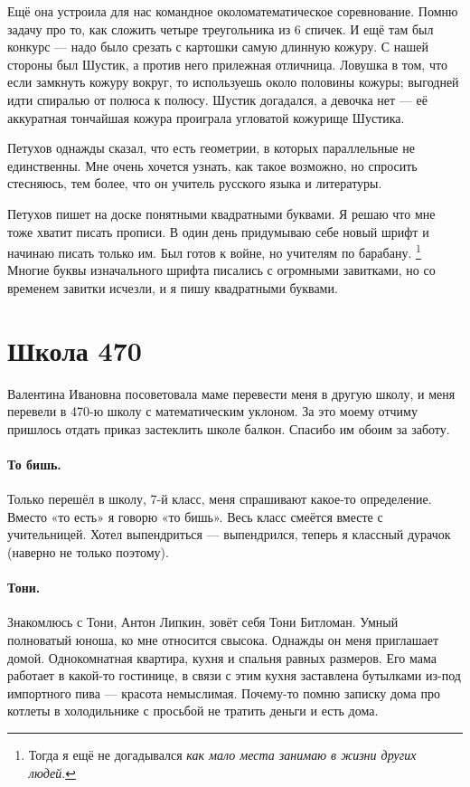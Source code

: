 \documentclass{book}
\begin{document}
Ещё она устроила для нас командное околоматематическое соревнование.
Помню задачу про то, как сложить четыре треугольника из 6 спичек.
И ещё там был конкурс --- надо было срезать с картошки самую длинную кожуру.
С нашей стороны был Шустик, а против него прилежная отличница.
Ловушка в том, что если замкнуть кожуру вокруг, то используешь около половины кожуры; выгодней идти спиралью от полюса к полюсу.
Шустик догадался, а девочка нет --- её аккуратная тончайшая кожура проиграла угловатой кожурище Шустика.

Петухов однажды сказал, что есть геометрии, в которых параллельные не единственны.
Мне очень хочется узнать, как такое возможно, но спросить стесняюсь, тем более, что он учитель русского языка и литературы.

Петухов пишет на доске понятными квадратными буквами.
Я решаю что мне тоже хватит писать прописи.
В один день придумываю себе новый шрифт и начинаю писать только им.
Был готов к войне, но учителям по барабану.%
\footnote{Тогда я ещё не догадывался \textit{как мало места занимаю в жизни других людей}.}
Многие буквы изначального шрифта писались с огромными завитками, но со временем завитки исчезли, и я пишу квадратными буквами.



\section*{Школа 470}

Валентина Ивановна посоветовала маме перевести меня в другую школу, и
меня перевели в 470-ю школу с математическим уклоном.
За это моему отчиму пришлось отдать приказ застеклить школе балкон.
Спасибо им обоим за заботу.

\paragraph{То бишь.}
Только перешёл в школу, 7-й класс, 
меня спрашивают какое-то определение.
Вместо «то есть» я говорю «то бишь». 
Весь класс смеётся вместе с учительницей.
Хотел выпендриться --- выпендрился, теперь я классный дурачок (наверно не только поэтому).

\paragraph{Тони.} 
Знакомлюсь с Тони, Антон Липкин, зовёт себя Тони Битломан.
Умный полноватый юноша, ко мне относится свысока.
Однажды он меня приглашает домой.
Однокомнатная квартира, кухня и спальня равных размеров.
Его мама работает в какой-то гостинице, в связи с этим кухня заставлена бутылками из-под импортного пива --- красота немыслимая.
Почему-то помню записку дома про котлеты в холодильнике с просьбой не тратить деньги и есть дома.
\end{document}
